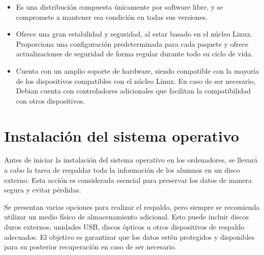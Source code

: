		\begin{itemize}
		
		
			\item Es una distribución compuesta únicamente por software libre, y se compromete a mantener esa condición en todas sus versiones.
			
			\item Ofrece una gran estabilidad y seguridad, al estar basado en el núcleo Linux. Proporciona una configuración 
			predeterminada para cada paquete y ofrece actualizaciones de seguridad de forma regular durante todo su ciclo de vida.
			
			\item Cuenta con un amplio soporte de hardware, siendo compatible con la mayoría de los dispositivos compatibles con el núcleo Linux. En caso de ser necesario, Debian cuenta con controladores adicionales que facilitan la compatibilidad con otros dispositivos.
		
		
		\end{itemize}

			
	\section{Instalación del sistema operativo}
			
	 		Antes de iniciar la instalación del sistema operativo en los ordenadores, se llevará a cabo la tarea de respaldar toda la información de los alumnos en un disco externo. Esta acción es considerada esencial para preservar los datos de manera segura y evitar pérdidas.
	 		
	 		Se presentan varias opciones para realizar el respaldo, pero siempre se recomienda utilizar un medio físico de almacenamiento adicional. Esto puede incluir discos duros externos, unidades USB, discos ópticos u otros dispositivos de respaldo adecuados. El objetivo es garantizar que los datos estén protegidos y disponibles para su posterior recuperación en caso de ser necesario.\par 
			
		
		
			
